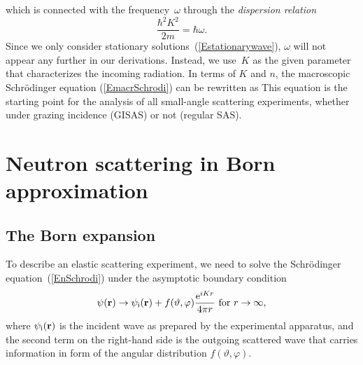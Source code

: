 which is connected with the frequency~$\omega$ through the
\textit{dispersion relation}
\begin{equation}
  \frac{\hbar^2 K^2}{2m} = \hbar\omega.
\end{equation}
Since we only consider stationary solutions~(\ref{Estationarywave}),
$\omega$ will not appear any further in our derivations.
Instead, we use~$K$ as the given parameter that characterizes the
incoming radiation.
In terms of $K$ and $n$,
the macroscopic Schrödinger equation (\ref{EmacrSchrodi})
can be rewritten as
This equation is the starting point for the analysis of all
small-angle scattering experiments,
whether under grazing incidence (GISAS) or not (regular SAS).
%
%

%
%

\section{Neutron scattering in Born approximation}

\subsection{The Born expansion}\label{SBorn}

%

To describe an elastic scattering experiment,
we need to solve the Schrödinger equation~(\ref{EnSchrodi})
under the asymptotic boundary condition
\begin{equation}\label{Escabouco}
  \psi(\mathbf{r})
  \to \psi_{\text{i}}(\mathbf{r}) + f(\vartheta,\varphi)\frac{\text{e}^{iKr}}{4\pi r}
  \text{~for~}r\to\infty,
\end{equation}
%
%
where $\psi_{\text{i}}(\mathbf{r})$ is the incident wave
as prepared by the experimental apparatus,
and the second term on the right-hand side is
the outgoing scattered wave
that carries information in form of the angular distribution
$f(\vartheta,\varphi)$.

